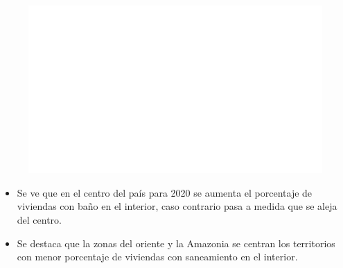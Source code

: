     \begin{figure}[H]
        \caption[Saneamiento dentro de la vivienda por departamentos (mapa) - 2010 VS 2020 ]{\label{saneamiento_dentro_dptos_mapa} }
        \begin{center}
        \includegraphics[width=\textwidth,keepaspectratio]{img/var_193_map.png}
        \end{center}
    \end{figure}
            \begin{itemize}
                    \item Se ve que en el centro del país para 2020 se aumenta el porcentaje de viviendas con baño en el interior, caso contrario pasa a medida que se aleja del centro. 
                    \item Se destaca que la zonas del oriente y la Amazonia se centran los territorios con menor porcentaje de viviendas con saneamiento en el interior.
                    \end{itemize}

